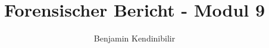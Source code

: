 \documentclass[11pt,a4paper]{scrreprt}
\author{Benjamin Kendinibilir}
\title{Forensischer Bericht - Modul 9}
\begin{document}
\begin{titlepage}
\maketitle
\end{titlepage}
\tableofcontents





\end{document}
